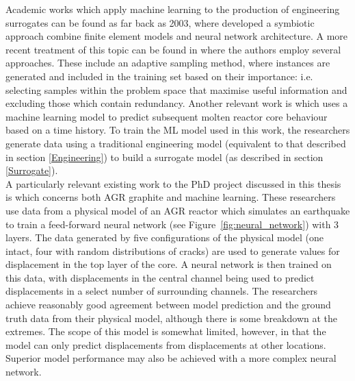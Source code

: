 \noindent
Academic works which apply machine learning to the production of engineering surrogates can be found as far back as 2003, where \cite{javadi2003neural} developed a symbiotic approach combine finite element models and neural network architecture. A more recent treatment of this topic can be found in \cite{kim2019machine} where the authors employ several approaches. These include an adaptive sampling method, where instances are generated and included in the training set based on their importance: i.e. selecting samples within the problem space that maximise useful information and excluding those which contain redundancy. Another relevant work is \cite{zeng2018machine} which uses a machine learning model to predict subsequent molten reactor core behaviour based on a time history. To train the ML model used in this work, the researchers generate data using a traditional engineering model (equivalent to that described in section \ref{Engineering}) to build a surrogate model (as described in section \ref{Surrogate}).  
\\

\noindent
A particularly relevant existing work to the PhD project discussed in this thesis is \cite{dihoru2018neural} which concerns both AGR graphite and machine learning. These researchers use data from a physical model of an AGR reactor which simulates an earthquake to train a feed-forward neural network (see Figure~\ref{fig:neural_network}) with 3 layers. The data generated by five configurations of the physical model (one intact, four with random distributions of cracks) are used to generate values for displacement in the top layer of the core. A neural network is then trained on this data, with displacements in the central channel being used to predict displacements in a select number of surrounding channels. The researchers achieve reasonably good agreement between model prediction and the ground truth data from their physical model, although there is some breakdown at the extremes. The scope of this model is somewhat limited, however, in that the model can only predict displacements from displacements at other locations. Superior model performance may also be achieved with a more complex neural network.  

